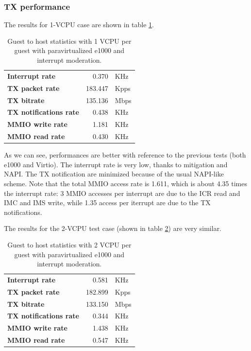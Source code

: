 \subsubsection{TX performance}
The results for 1-VCPU case are shown in table \ref{tab:e1000-par-tx-g2h1vcpu}.
\begin{table}
\begin{center}
\begin{tabular}{lrl}
\toprule
\textbf{Interrupt rate} & 0.370 & KHz\\
\textbf{TX packet rate} & 183.447 & Kpps\\
\textbf{TX bitrate} & 135.136 & Mbps\\
\textbf{TX notifications rate} & 0.438 & KHz\\
\textbf{MMIO write rate} & 1.181 & KHz\\
\textbf{MMIO read rate} & 0.430 & KHz\\
\bottomrule
\end{tabular}
\end{center}
\caption{Guest to host statistics with 1 VCPU per guest with paravirtualized e1000 and interrupt moderation.}
\label{tab:e1000-par-tx-g2h1vcpu}
\end{table}

As we can see, performances are better with reference to the previous tests (both e1000 and Virtio). The interrupt rate is very low,
thanks to mitigation and NAPI. The TX notification are minimized because of the usual NAPI-like scheme.
Note that the total MMIO access rate is 1.611, which is about 4.35 times the interrupt rate: 3 MMIO accesses per interrupt are due
to the ICR read and IMC and IMS write, while 1.35 access per iterrupt are due to the TX notifications.

\vspace{0.5cm}

The results for the 2-VCPU test case (shown in table \ref{tab:e1000-par-tx-g2h2vcpu}) are very similar.
\begin{table}
\begin{center}
\begin{tabular}{lrl}
\toprule
\textbf{Interrupt rate} & 0.581 & KHz\\
\textbf{TX packet rate} & 182.899 & Kpps\\
\textbf{TX bitrate} & 133.150 & Mbps\\
\textbf{TX notifications rate} & 0.344 & KHz\\
\textbf{MMIO write rate} & 1.438 & KHz\\
\textbf{MMIO read rate} & 0.547 & KHz\\
\bottomrule
\end{tabular}
\end{center}
\caption{Guest to host statistics with 2 VCPU per guest with paravirtualized e1000 and interrupt moderation.}
\label{tab:e1000-par-tx-g2h2vcpu}
\end{table}


